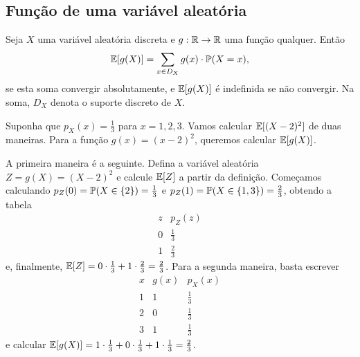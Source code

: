 


\subsection{Função de uma variável aleatória}

\begin{proposition}
\label{prop:lus}
Seja $ X $ uma variável aleatória discreta e $ g:\mathbb{R} \to \mathbb{R} $ uma função qualquer.
Então
\[
\mathbb{E}[g(X)] = \sum_{x \in D_X} g(x) \cdot \mathbb{P}(X=x),
\]
se esta soma convergir absolutamente, e $ \mathbb{E}[g(X)] $ é indefinida se não convergir.
Na soma, $ D_X $ denota o suporte discreto de $ X $.
\end{proposition}

\begin{example}
Suponha que $ p_X(x)=\frac{1}{3} $ para $ x=1,2,3 $.
Vamos calcular $ \mathbb{E}[(X-2)^2] $ de duas maneiras.
Para a função $ g(x)=(x-2)^2 $, queremos calcular $ \mathbb{E}[g(X)] $.

A primeira maneira é a seguinte.
Defina a variável aleatória $ Z = g(X) = (X-2)^2 $ e calcule $ \mathbb{E}[Z] $ a partir da definição.
Começamos calculando $ p_Z(0) = \mathbb{P}(X \in \{2\}) = \frac{1}{3} $ e $ p_Z(1) = \mathbb{P}(X \in \{1,3\}) = \frac{2}{3} $, obtendo a tabela
\[
\begin{array}{c|c}
z & p_Z(z) \\
\hline
0 & \frac{1}{3}
\\
1 & \frac{2}{3}
\end{array}
\]
e, finalmente, $ \mathbb{E}[Z] = 0 \cdot \frac{1}{3} + 1 \cdot \frac{2}{3} = \frac{2}{3} $.
Para a segunda maneira, basta escrever
\[
\begin{array}{c|c|c}
x & g(x) & p_X(x) \\
\hline
1 & 1 & \frac{1}{3}
\\
2 & 0 & \frac{1}{3}
\\
3 & 1 & \frac{1}{3}
\end{array}
\]
e calcular $ \mathbb{E}[g(X)] = 1 \cdot \frac{1}{3} + 0 \cdot \frac{1}{3} + 1 \cdot \frac{1}{3} = \frac{2}{3} $.
\end{example}


